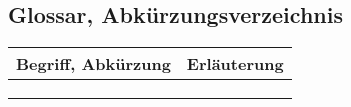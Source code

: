 \subsection{Glossar, Abkürzungsverzeichnis}

\begin{tabularx}{\textwidth}{| >{\scriptsize}p{4cm} | >{\scriptsize}X |}
    \hline
    \rowcolor{lightgray} 
    Begriff, Abkürzung               & Erläuterung \\ \hline
    & \\ \hline
    & \\ \hline
    & \\ \hline
\end{tabularx}
